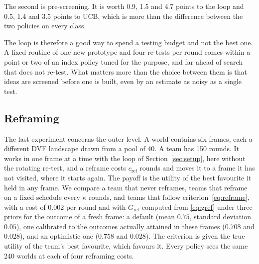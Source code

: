\documentclass[10pt,twocolumn]{article}
\theoremstyle{definition}
\begin{document}
The second is pre-screening. It is worth 0.9, 1.5 and 4.7 points to the loop and 0.5, 1.4 and 3.5 points to UCB, which is more than the difference between the two policies on every class.

The loop is therefore a good way to spend a testing budget and not the best one. A fixed routine of one new prototype and four re-tests per round comes within a point or two of an index policy tuned for the purpose, and far ahead of search that does not re-test. What matters more than the choice between them is that ideas are screened before one is built, even by an estimate as noisy as a single test.

\subsection{Reframing}
\label{sec:reframesim}

The last experiment concerns the outer level. A world contains six frames, each a different DVF landscape drawn from a pool of 40. A team has 150 rounds. It works in one frame at a time with the loop of Section~\ref{sec:setup}, here without the rotating re-test, and a reframe costs $c_{\mathrm{ref}}$ rounds and moves it to a frame it has not visited, where it starts again. The payoff is the utility of the best favourite it held in any frame. We compare a team that never reframes, teams that reframe on a fixed schedule every $\kappa$ rounds, and teams that follow criterion~\eqref{eq:reframe}, with a cost of $0.002$ per round and with $G_{\mathrm{ref}}$ computed from \eqref{eq:gref} under three priors for the outcome of a fresh frame: a default (mean $0.75$, standard deviation $0.05$), one calibrated to the outcomes actually attained in these frames ($0.708$ and $0.028$), and an optimistic one ($0.758$ and $0.028$). The criterion is given the true utility of the team's best favourite, which favours it. Every policy sees the same 240 worlds at each of four reframing costs.
\end{document}
